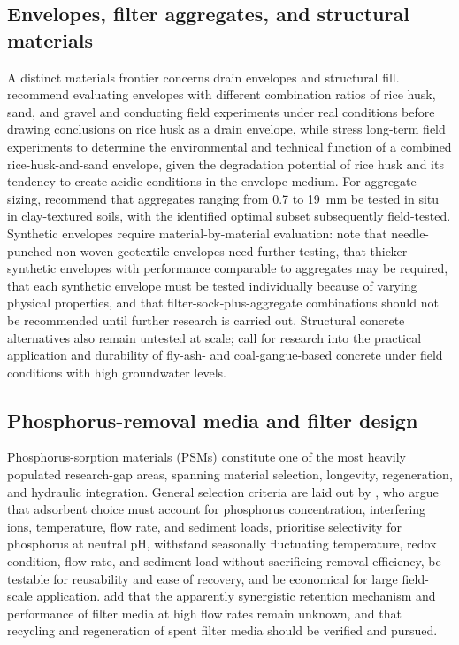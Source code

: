 \documentclass[11pt]{article}
\begin{document}
\subsection{Envelopes, filter aggregates, and structural materials}
A distinct materials frontier concerns drain envelopes and structural fill. \textcite{Kaboosi2012} recommend evaluating envelopes with different combination ratios of rice husk, sand, and gravel and conducting field experiments under real conditions before drawing conclusions on rice husk as a drain envelope, while \textcite{Navabian2017} stress long-term field experiments to determine the environmental and technical function of a combined rice-husk-and-sand envelope, given the degradation potential of rice husk and its tendency to create acidic conditions in the envelope medium. For aggregate sizing, \textcite{Byrne2023} recommend that aggregates ranging from 0.7 to 19~mm be tested in situ in clay-textured soils, with the identified optimal subset subsequently field-tested. Synthetic envelopes require material-by-material evaluation: \textcite{Byrne2023b} note that needle-punched non-woven geotextile envelopes need further testing, that thicker synthetic envelopes with performance comparable to aggregates may be required, that each synthetic envelope must be tested individually because of varying physical properties, and that filter-sock-plus-aggregate combinations should not be recommended until further research is carried out. Structural concrete alternatives also remain untested at scale; \textcite{Wang2016c} call for research into the practical application and durability of fly-ash- and coal-gangue-based concrete under field conditions with high groundwater levels.

\subsection{Phosphorus-removal media and filter design}
Phosphorus-sorption materials (PSMs) constitute one of the most heavily populated research-gap areas, spanning material selection, longevity, regeneration, and hydraulic integration. General selection criteria are laid out by \textcite{Li2020}, who argue that adsorbent choice must account for phosphorus concentration, interfering ions, temperature, flow rate, and sediment loads, prioritise selectivity for phosphorus at neutral pH, withstand seasonally fluctuating temperature, redox condition, flow rate, and sediment load without sacrificing removal efficiency, be testable for reusability and ease of recovery, and be economical for large field-scale application. \textcite{Mendes2022} add that the apparently synergistic retention mechanism and performance of filter media at high flow rates remain unknown, and that recycling and regeneration of spent filter media should be verified and pursued.
\end{document}
